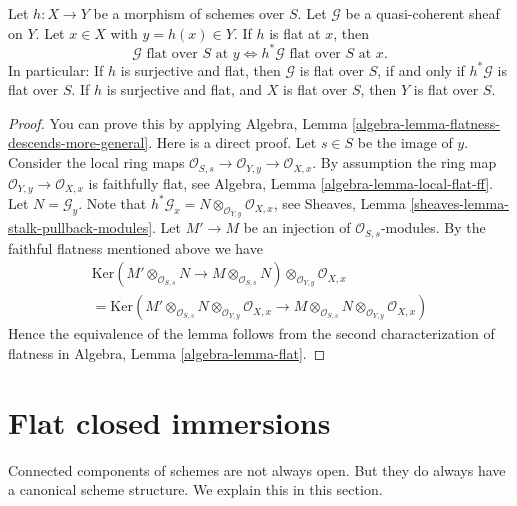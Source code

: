 \begin{lemma}
\label{lemma-flat-permanence}
Let $h : X \to Y$ be a morphism of schemes over $S$.
Let $\mathcal{G}$ be a quasi-coherent sheaf on $Y$.
Let $x \in X$ with $y = h(x) \in Y$. If $h$ is flat at $x$, then
$$
\mathcal{G}\text{ flat over }S\text{ at }y
\Leftrightarrow
h^*\mathcal{G}\text{ flat over }S\text{ at }x.
$$
In particular: If $h$ is surjective and flat, then
$\mathcal{G}$ is flat over $S$, if and only if
$h^*\mathcal{G}$ is flat over $S$. If $h$ is surjective and
flat, and $X$ is flat over $S$, then $Y$ is flat over $S$.
\end{lemma}

\begin{proof}
You can prove this by applying
Algebra, Lemma \ref{algebra-lemma-flatness-descends-more-general}.
Here is a direct proof. Let $s \in S$ be the image of $y$.
Consider the local ring maps
$\mathcal{O}_{S, s} \to \mathcal{O}_{Y, y} \to \mathcal{O}_{X, x}$.
By assumption the ring map $\mathcal{O}_{Y, y} \to \mathcal{O}_{X, x}$
is faithfully flat, see
Algebra, Lemma \ref{algebra-lemma-local-flat-ff}.
Let $N = \mathcal{G}_y$. Note that
$h^*\mathcal{G}_x = N \otimes_{\mathcal{O}_{Y, y}} \mathcal{O}_{X, x}$, see
Sheaves, Lemma \ref{sheaves-lemma-stalk-pullback-modules}.
Let $M' \to M$ be an injection of $\mathcal{O}_{S, s}$-modules.
By the faithful flatness mentioned above we have
\begin{align*}
\text{Ker}(
M' \otimes_{\mathcal{O}_{S, s}} N \to M \otimes_{\mathcal{O}_{S, s}} N)
\otimes_{\mathcal{O}_{Y, y}} \mathcal{O}_{X, x} \\
=
\text{Ker}(
M' \otimes_{\mathcal{O}_{S, s}} N
\otimes_{\mathcal{O}_{Y, y}} \mathcal{O}_{X, x}
\to
M \otimes_{\mathcal{O}_{S, s}} N
\otimes_{\mathcal{O}_{Y, y}} \mathcal{O}_{X, x})
\end{align*}
Hence the equivalence of the lemma follows from the second characterization
of flatness in
Algebra, Lemma \ref{algebra-lemma-flat}.
\end{proof}





\section{Flat closed immersions}
\label{section-flat-closed-immersions}

\noindent
Connected components of schemes are not always open. But they do always
have a canonical scheme structure. We explain this in this section.

